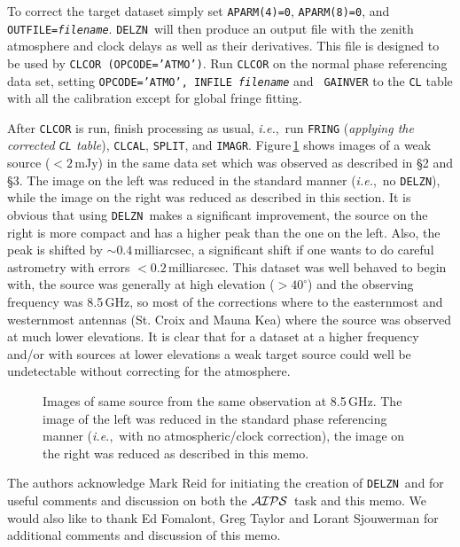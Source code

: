 \documentclass[preprint]{aastex}
\newcommand{\AIPS}{{$\cal AIPS\/$}}
\newcommand{\DELZN}{{\tt DELZN}}
\newcommand{\ie}{{\it i.e.},}
\begin{document}
To correct the target dataset simply set {\tt APARM(4)=0}, {\tt APARM(8)=0},
and {\tt OUTFILE={\it filename}}.  \DELZN\ will then produce an output
file with the zenith atmosphere and clock delays as well as their
derivatives.  This file is designed to be used by {\tt CLCOR
(OPCODE='ATMO')}. Run {\tt CLCOR} on the normal phase referencing data
set, setting {\tt OPCODE='ATMO', INFILE {\it filename}} and {\tt
GAINVER} to the {\tt CL} table with all the calibration except for
global fringe fitting.

After {\tt CLCOR} is run, finish processing as usual, \ie\
run {\tt FRING} ({\it applying the corrected {\tt CL} table}), {\tt CLCAL},
{\tt SPLIT}, and {\tt IMAGR}.  Figure\,\ref{images} shows
images of a weak source ($< 2$\,mJy) in the same data set which was
observed as described in \S 2 and \S 3.  The image on the left was reduced
in the standard manner (\ie\ no \DELZN ), while the image on the right
was reduced as described in this section.  It is obvious that using
\DELZN\ makes a significant improvement, the source on the right
is more compact and has a higher peak than the one on the left.  Also, the
peak is shifted by $\sim 0.4$\,milliarcsec, a significant shift if one wants
to do careful astrometry with errors $< 0.2$\,milliarcsec.  This
dataset was well behaved to begin with, the source was generally at high
elevation ($> 40^\circ$) and the observing frequency was 8.5\,GHz, so most
of the corrections where to the easternmost and westernmost antennas (St. Croix
and Mauna Kea) where the source was observed at much lower elevations. It
is clear that for a dataset at a higher frequency and/or with sources at lower
elevations a weak target source could well be undetectable without correcting
for the atmosphere.

\begin{figure}[t!]
\caption{Images of same source from the same observation at 8.5\,GHz.
The image of the left
was reduced in the standard phase referencing manner (\ie\ with no
atmospheric/clock correction), the image on the right was reduced as
described in this memo.}
\label{images}
\end{figure}

\bigskip

The authors acknowledge Mark Reid for initiating the creation of \DELZN\
and for useful comments and discussion on both the \AIPS\ task and this memo.
We would also like to thank Ed Fomalont, Greg Taylor and Lorant Sjouwerman
for additional comments and discussion of this memo.
\end{document}
